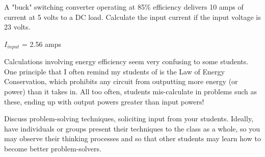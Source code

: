 

A "buck" switching converter operating at 85\% efficiency delivers 10 amps of current at 5 volts to a DC load.  Calculate the input current if the input voltage is 23 volts.  







$I_{input}$ = 2.56 amps







Calculations involving energy efficiency seem very confusing to some students.  One principle that I often remind my students of is the Law of Energy Conservation, which prohibits any circuit from outputting more energy (or power) than it takes in.  All too often, students mis-calculate in problems such as these, ending up with output powers greater than input powers!  

Discuss problem-solving techniques, soliciting input from your students.  Ideally, have individuals or groups present their techniques to the class as a whole, so you may observe their thinking processes and so that other students may learn how to become better problem-solvers.




